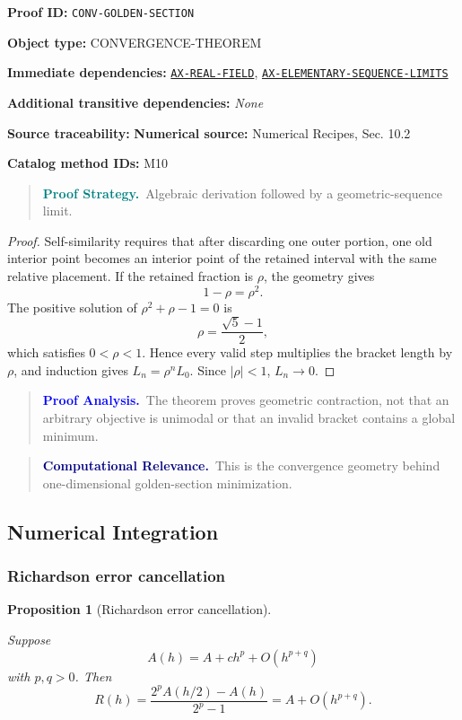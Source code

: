 \documentclass[10pt]{article}
\newcommand{\pidraw}[1]{\begingroup\urlstyle{tt}\nolinkurl{#1}\endgroup}
\newcommand{\pidref}[1]{\hyperref[prf:#1]{\pidraw{#1}}}
\newtheorem{proposition}[theorem]{Proposition}
\theoremstyle{definition}
\theoremstyle{remark}
\newenvironment{proofstrategy}
{\begin{quote}\small\noindent\textbf{\textcolor{teal}{Proof Strategy.}}\ }
{\end{quote}}
\newenvironment{proofanalysis}
{\begin{quote}\small\noindent\textbf{\textcolor{blue}{Proof Analysis.}}\ }
{\end{quote}}
\newenvironment{computationalrelevance}
{\begin{quote}\small\noindent\textbf{\textcolor{navy}{Computational Relevance.}}\ }
{\end{quote}}
\newcommand{\meta}[2]{\noindent\textbf{#1:} #2\par}
\begin{document}
\meta{Proof ID}{\pidraw{CONV-GOLDEN-SECTION}}
\meta{Object type}{CONVERGENCE-THEOREM}
\meta{Immediate dependencies}{\pidref{AX-REAL-FIELD}, \pidref{AX-ELEMENTARY-SEQUENCE-LIMITS}}
\meta{Additional transitive dependencies}{\emph{None}}
\meta{Source traceability}{\textbf{Numerical source:} Numerical Recipes, Sec. 10.2}
\meta{Catalog method IDs}{M10}

\begin{proofstrategy}Algebraic derivation followed by a geometric-sequence limit.\end{proofstrategy}

\begin{proof}

Self-similarity requires that after discarding one outer portion, one old interior
point becomes an interior point of the retained interval with the same relative
placement. If the retained fraction is $\rho$, the geometry gives
\[
1-\rho=\rho^2.
\]
The positive solution of $\rho^2+\rho-1=0$ is
\[
\rho=\frac{\sqrt5-1}{2},
\]
which satisfies $0<\rho<1$. Hence every valid step multiplies the bracket length
by $\rho$, and induction gives $L_n=\rho^nL_0$. Since $|\rho|<1$,
$L_n\to0$.

\end{proof}

\begin{proofanalysis}The theorem proves geometric contraction, not that an arbitrary objective is unimodal or that an invalid bracket contains a global minimum.\end{proofanalysis}

\begin{computationalrelevance}This is the convergence geometry behind one-dimensional golden-section minimization.\end{computationalrelevance}

\subsection{Numerical Integration}

\subsubsection{Richardson error cancellation}

\begin{proposition}[Richardson error cancellation]\label{prf:DER-RICHARDSON}

Suppose
\[
A(h)=A+c h^p+O(h^{p+q})
\]
with $p,q>0$. Then
\[
R(h)=\frac{2^pA(h/2)-A(h)}{2^p-1}
=
A+O(h^{p+q}).
\]

\end{proposition}
\end{document}
